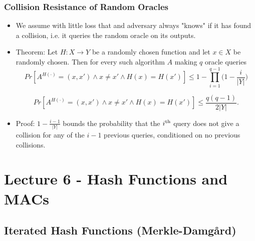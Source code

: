 \documentclass[a4paper]{scrartcl}
\newcommand{\ts}{\textsuperscript}
\begin{document}
\subsubsection*{Collision Resistance of Random Oracles}

\begin{itemize}
\item We assume with little loss that and adversary always "knows" if it has found a collision, i.e. it queries the random oracle on its outputs.
\item Theorem: Let $H: X \rightarrow Y$ be a randomly chosen function and let $x \in X$ be randomly chosen. Then for every such algorithm $A$ making $q$ oracle queries
$$Pr[A^{H(\cdot)} = (x, x') \land x \neq x' \land H(x) = H(x')] \leq 1 - \prod_{i=1}^{q-1} \bigg(1 - \frac{i}{|Y|} \bigg)$$

$$Pr[A^{H(\cdot)} = (x, x') \land x \neq x' \land H(x) = H(x')] \leq \frac{q(q-1)}{2|Y|} .$$

\item Proof: $1 - \frac{i-1}{|Y|}$ bounds the probability that the $i\ts{th}$ query does not give a collision for any of the $i-1$ previous queries, conditioned on no previous collisions. 
\end{itemize}

\section*{Lecture 6 - Hash Functions and MACs}

\subsection*{Iterated Hash Functions (Merkle-Damg\aa rd)}
\end{document}
